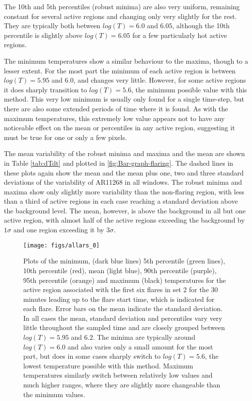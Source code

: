 \documentclass{article}
\begin{document}
The 10th and 5th percentiles (robust minima) are also very uniform,
remaining constant for several active regions and changing only very
slightly for the rest. They are typically both between $log(T)=6.0$
and $6.05$, although the 10th percentile is slightly above $log(T)=6.05$
for a few particularly hot active regions.

The minimum temperatures show a similar behaviour to the maxima, though
to a lesser extent. For the most part the minimum of each active region
is between $log(T)=5.95$ and $6.0$, and changes very little. However,
for some active regions it does sharply transition to $log(T)=5.6$,
the minimum possible value with this method. This very low minimum
is usually only found for a single time-step, but there are also some
extended periods of time where it is found. As with the maximum temperatures,
this extremely low value appears not to have any noticeable effect
on the mean or percentiles in any active region, suggesting it must
be true for one or only a few pixels.

The mean variability of the robust minima and maxima and the mean
are shown in Table \ref{tab:dTdt} and plotted in \ref{fig:Bar-graph-flaring}.
The dashed lines in these plots again show the mean and the mean plus
one, two and three standard deviations of the variability of AR11268
in all windows. The robust minima and maxima show only slightly more
variability than the non-flaring region, with less than a third of
active regions in each case reaching a standard deviation above the
background level. The mean, however, is above the background in all
but one active region, with almost half of the active regions exceeding
the background by $1\sigma$ and one region exceeding it by $3\sigma$.

\begin{figure}
\begin{centering}
\texttt{[image: figs/allars\_0]} 
\par\end{centering}

\caption{Plots of the minimum, (dark blue lines) 5th percentile (green lines),
10th percentile (red), mean (light blue), 90th percentile (purple),
95th percentile (orange) and maximum (black) temperatures for the
active region associated with the first six flares in set 2 for the
30 minutes leading up to the flare start time, which is indicated
for each flare. Error bars on the mean indicate the standard deviation.
In all cases the mean, standard deviation and percentiles vary very
little throughout the sampled time and are closely grouped between
$log(T)=5.95$ and $6.2$. The minima are typically around $log(T)=6.0$
and also varies only a small amount for the most part, but does in
some cases sharply switch to $log(T)=5.6$, the lowest temperature
possible with this method. Maximum temperatures similarly switch between
relatively low values and much higher ranges, where they are slightly
more changeable than the minimum values. \label{fig:temps-v-time-xflares}}
\end{figure}
\end{document}
